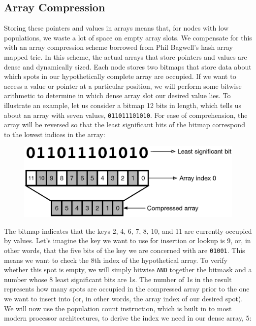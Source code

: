 \documentclass[preprint]{sigplanconf}
\begin{document}
\subsection{Array Compression}
Storing these pointers and values in arrays means that, for nodes with low populations, we waste a lot of space on empty array slots.
We compensate for this with an array compression scheme borrowed from Phil Bagwell's hash array mapped trie.
In this scheme, the actual arrays that store pointers and values are dense and dynamically sized.
Each node stores two bitmaps that store data about which spots in our hypothetically complete array are occupied. 
If we want to access a value or pointer at a particular position, we will perform some bitwise arithmetic to determine in which dense array slot our desired value lies.
To illustrate an example, let us consider a bitmap 12 bits in length, which tells us about an array with seven values, \texttt{011011101010}.
For ease of comprehension, the array will be reversed so that the least significant bits of the bitmap correspond to the lowest indices in the array:
\begin{figure}[H]
\includegraphics[scale=.43]{bitmask}
\centering
\end{figure}
The bitmap indicates that the keys 2, 4, 6, 7, 8, 10, and 11 are currently occupied by values.
Let's imagine the key we want to use for insertion or lookup is 9, or, in other words, that the five bits of the key we are concerned with are \texttt{01001}.
This means we want to check the 8th index of the hypothetical array.
To verify whether this spot is empty, we will simply bitwise \texttt{AND} together the bitmask and a number whose 8 least significant bits are 1s.
The number of 1s in the result represents how many spots are occupied in the compressed array prior to the one we want to insert into (or, in other words, the array index of our desired spot).
We will now use the population count instruction, which is built in to most modern processor architectures, to derive the index we need in our dense array, 5:
\end{document}
